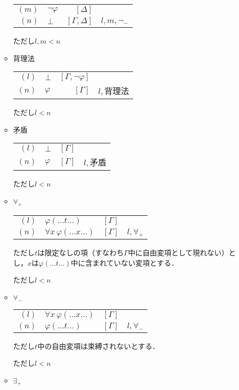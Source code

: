 \documentclass[10pt,b5paper,papersize,dvipdfmx]{jsbook}
\newcommand\fal[1]{\forall#1\,}
\begin{document}
\begin{itemize}
\begin{itemize}
\begin{table}[H]
\begin{tabular}{rlrl}
          $(m)$&$\lnot \varphi$&$[\Delta]$& \\
          $(n)$&$\bot$&$[\Gamma,\Delta]$&$l,m,\lnot_-$
        \end{tabular}
      \end{table}
      ただし$l,m<n$
    \item 背理法
      \begin{table}[H]
        \centering
        \begin{tabular}{rlrl}
          $(l)$&$\bot$&$[\Gamma,\lnot \varphi]$& \\
          $(n)$&$\varphi$&$[\Gamma]$&$l,$背理法
        \end{tabular}
      \end{table}
      ただし$l<n$
    \item 矛盾
        \begin{table}[H]
          \centering
          \begin{tabular}{rlrl}
              $(l)$&$\bot$&$[\Gamma]$& \\
          $(n)$&$\varphi$&$[\Gamma]$&$l,$矛盾
          \end{tabular}
        \end{table}
        ただし$l<n$
    \item $\forall_+$
      \begin{table}[H]
        \centering
        \begin{tabular}{rlrl}
        $(l)$&$\varphi(\dots t \dots)$&$[\Gamma]$& \\
          $(n)$&$\fal{x} \varphi(\dots x \dots)$&$[\Gamma]$&$l,\forall_+$
        \end{tabular}
      \end{table}
      ただし$t$は限定なしの項（すなわち$\Gamma$中に自由変項として現れない）とし，$x$は$\varphi(\dots t \dots)$中に含まれていない変項とする． \par
      ただし$l<n$
    \item $\forall_-$
      \begin{table}[H]
        \centering
        \begin{tabular}{rlrl}
        $(l)$&$\fal{x}\varphi(\dots x \dots)$&$[\Gamma]$& \\
        $(n)$&$\varphi(\dots t \dots)$&$[\Gamma]$&$l,\forall_-$
        \end{tabular}
      \end{table}
      ただし$t$中の自由変項は束縛されないとする．\par
      ただし$l<n$
    \item $\exists_+$

\end{itemize}
\end{itemize}
\end{document}
